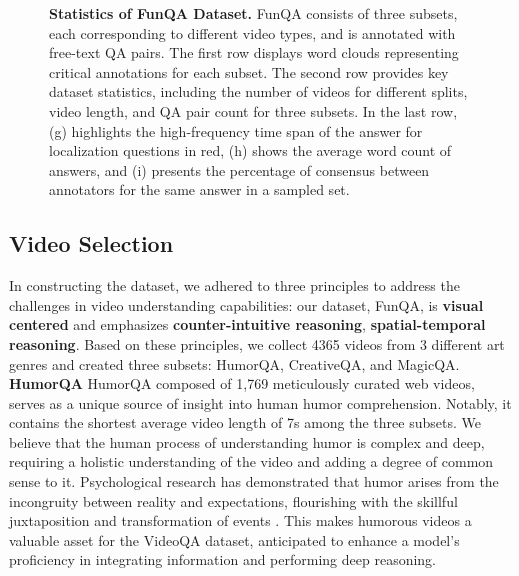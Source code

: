 \begin{figure}[!t]
  

  \caption{\textbf{Statistics of FunQA Dataset.} FunQA consists of three subsets, each corresponding to different video types, and is annotated with free-text QA pairs. The first row displays word clouds representing critical annotations for each subset. The second row provides key dataset statistics, including the number of videos for different splits, video length, and QA pair count for three subsets. In the last row, (g) highlights the high-frequency time span of the answer for localization questions in red, (h) shows the average word count of answers, and (i) presents the percentage of consensus between annotators for the same answer in a sampled set.
  }
  \vspace{-0.4cm}
  \label{fig:dataset statistics}
\end{figure}


\subsection{Video Selection}
In constructing the dataset, we adhered to three principles to address the challenges in video understanding capabilities: our dataset, FunQA, is \textbf{visual centered} and emphasizes \textbf{counter-intuitive reasoning}, \textbf{spatial-temporal reasoning}. Based on these principles, we collect 4365 videos from 3 different art genres and created three subsets: HumorQA, CreativeQA, and MagicQA.\\
\noindent\textbf{HumorQA}\quad
HumorQA composed of 1,769 meticulously curated web videos, serves as a unique source of insight into human humor comprehension. Notably, it contains the shortest average video length of 7s among the three subsets. We believe that the human process of understanding humor is complex and deep, requiring a holistic understanding of the video and adding a degree of common sense to it. Psychological research has demonstrated that humor arises from the incongruity \cite{kant1987critique,sep-humor} between reality and expectations, flourishing with the skillful juxtaposition and transformation of events \cite{latta1999basic,boyd2004laughter,koestler2020act}. This makes humorous videos a valuable asset for the VideoQA dataset, anticipated to enhance a model's proficiency in integrating information and performing deep reasoning.\\
